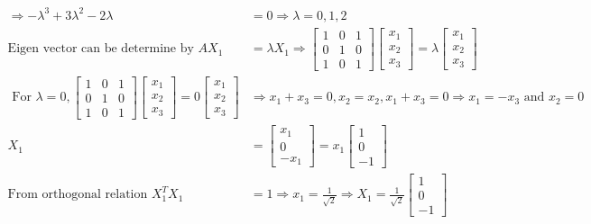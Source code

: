 \begin{enumerate}
\begin{answer}
\begin{align*}
		\Rightarrow-\lambda^{3}+3 \lambda^{2}-2 \lambda&=0 \Rightarrow \lambda=0,1,2\\
		\text{Eigen vector can be determine by }A X_{1}&=\lambda X_{1} \Rightarrow\left[\begin{array}{lll}1 & 0 & 1 \\ 0 & 1 & 0 \\ 1 & 0 & 1\end{array}\right]\left[\begin{array}{l}x_{1} \\ x_{2} \\ x_{3}\end{array}\right]=\lambda\left[\begin{array}{l}x_{1} \\ x_{2} \\ x_{3}\end{array}\right]\\
	\text{	For }\lambda=0,
		\left[\begin{array}{lll}
		1 & 0 & 1 \\
		0 & 1 & 0 \\
		1 & 0 & 1
		\end{array}\right]\left[\begin{array}{l}
		x_{1} \\
		x_{2} \\
		x_{3}
		\end{array}\right]=0\left[\begin{array}{l}
		x_{1} \\
		x_{2} \\
		x_{3}
		\end{array}\right]& \Rightarrow x_{1}+x_{3}=0, x_{2}=x_{2}, x_{1}+x_{3}=0 \Rightarrow x_{1}=-x_{3} \text { and } x_{2}=0\\
		X_{1}&=\left[\begin{array}{c}
		x_{1} \\
		0 \\
		-x_{1}
		\end{array}\right]=x_{1}\left[\begin{array}{c}
		1 \\
		0 \\
		-1
		\end{array}\right]\\
		\text{From orthogonal relation }X_{1}^{T} X_{1}&=1 \Rightarrow x_{1}=\frac{1}{\sqrt{2}} \Rightarrow X_{1}=\frac{1}{\sqrt{2}}\left[\begin{array}{c}1 \\ 0 \\ -1\end{array}\right]

\end{align*}
\end{answer}
\end{enumerate}
